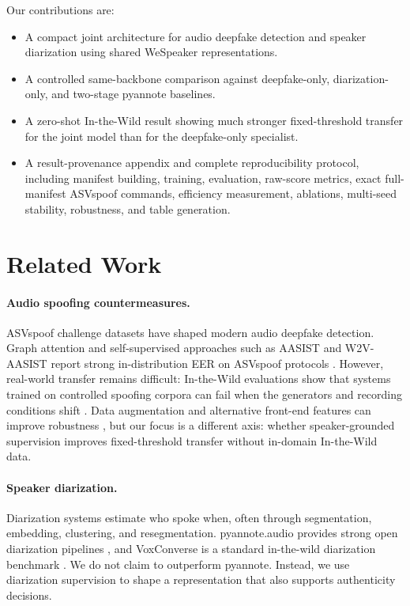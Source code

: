 \documentclass{article}
\newcommand{\eer}{EER}
\newcommand{\asv}{ASVspoof}
\newcommand{\itw}{In-the-Wild}
\begin{document}
Our contributions are:
\begin{itemize}
  \item A compact joint architecture for audio deepfake detection and speaker
        diarization using shared WeSpeaker representations.
  \item A controlled same-backbone comparison against deepfake-only,
        diarization-only, and two-stage pyannote baselines.
  \item A zero-shot \itw{} result showing much stronger fixed-threshold transfer
        for the joint model than for the deepfake-only specialist.
  \item A result-provenance appendix and complete reproducibility protocol,
        including manifest building, training, evaluation, raw-score metrics,
        exact full-manifest \asv{} commands, efficiency measurement, ablations,
        multi-seed stability, robustness, and table generation.
\end{itemize}

\section{Related Work}

\paragraph{Audio spoofing countermeasures.}
\asv{} challenge datasets have shaped modern audio deepfake detection.  Graph
attention and self-supervised approaches such as AASIST and W2V-AASIST report
strong in-distribution \eer{} on \asv{} protocols
\citep{jung2022aasist,tak2022w2vaasist}.  However, real-world transfer remains
difficult: \itw{} evaluations show that systems trained on controlled spoofing
corpora can fail when the generators and recording conditions shift
\citep{muller2022interspeech,wang2022itw}.  Data augmentation and alternative
front-end features can improve robustness \citep{kawa2023}, but our focus is a
different axis: whether speaker-grounded supervision improves fixed-threshold
transfer without in-domain \itw{} data.

\paragraph{Speaker diarization.}
Diarization systems estimate who spoke when, often through segmentation,
embedding, clustering, and resegmentation.  pyannote.audio provides strong open
diarization pipelines \citep{bredin2020pyannote,plaquet2023powerset}, and
VoxConverse is a standard in-the-wild diarization benchmark
\citep{chung2020voxconverse}.  We do not claim to outperform pyannote.  Instead,
we use diarization supervision to shape a representation that also supports
authenticity decisions.
\end{document}
